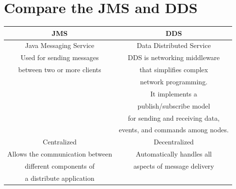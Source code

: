 \documentclass[11pt,a4paper]{article}
\begin{document}
	\section{Compare the JMS and DDS}
	\begin{tabular}{|c|c|}
	\hline 
	JMS & DDS \\ 
	\hline 
	Java Messaging Service & Data Distributed Service \\ 
	\hline 
	Used for sending messages & DDS is networking middleware \\ between two or more clients & that simplifies complex \\&network programming. \\&It implements a \\& publish/subscribe model  \\&for sending and receiving data, \\&events, and commands among nodes. \\
	\hline 
	Centralized & Decentralized \\ 
	\hline 
	Allows the communication between & Automatically handles all\\ different components of  & aspects of message delivery \\ a distribute application &\\
	\hline 
	\end{tabular} 
		
\end{document}

